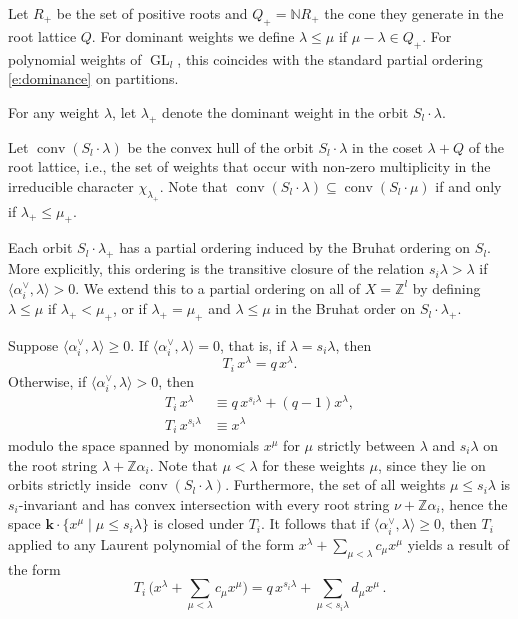 \documentclass[12pt]{amsart}
\theoremstyle{definition}
\theoremstyle{remark}
\newcommand{\NN}{{\mathbb N}}
\newcommand{\ZZ}{{\mathbb Z}}
\newcommand{\kk}{{\mathbf k}}
\DeclareMathOperator{\conv}{conv}
\DeclareMathOperator{\GL}{GL}
\newcommand{\chek}{^{\vee }}
\begin{document}
Let $R_{+}$ be the set of positive roots and $Q_{+} = \NN R_{+}$ the
cone they generate in the root lattice $Q$.  For dominant weights we
define $\lambda \leq \mu $ if $\mu -\lambda \in Q_{+}$.  For
polynomial weights of $\GL_{l}$, this coincides with the standard
partial ordering \eqref{e:dominance} on partitions.

For any weight $\lambda$, let $\lambda _{+}$ denote the dominant
weight in the orbit $S_{l}\cdot \lambda $.

Let $\conv (S_{l}\cdot \lambda )$ be the convex hull of the orbit
$S_{l}\cdot \lambda $ in the coset $\lambda +Q$ of the root lattice,
i.e., the set of weights that occur with non-zero multiplicity in the
irreducible character $\chi _{\lambda _{+}}$.  Note that $\conv
(S_{l}\cdot \lambda )\subseteq \conv (S_{l}\cdot \mu )$ if and only if
$\lambda _{+}\leq \mu _{+}$.

Each orbit $S_{l}\cdot \lambda _{+}$ has a partial ordering induced by
the Bruhat ordering on $S_{l}$.  More explicitly, this ordering is the
transitive closure of the relation $s_{i}\lambda >\lambda $ if
$\langle \alpha _{i}\chek ,\lambda \rangle>0$.  We extend this to a
partial ordering on all of $X = \ZZ ^{l}$ by defining $\lambda \leq
\mu $ if $\lambda _{+}<\mu _{+}$, or if $\lambda _{+} = \mu _{+} $ and
$\lambda \leq \mu $ in the Bruhat order on $S_{l}\cdot \lambda _{+}$.

Suppose $\langle \alpha
_{i}\chek ,\lambda \rangle \geq 0$.  If $\langle \alpha _{i}\chek
,\lambda \rangle = 0$, that is, if $\lambda =s_{i}\lambda $, then
\begin{equation}\label{e:Ti-triangularity-0}
T_{i}\, x^{\lambda } = q\, x^{\lambda }.
\end{equation}
Otherwise, if $\langle \alpha _{i}\chek ,\lambda \rangle >
0$, then
\begin{equation}\label{e:Ti-triagularity-1}
\begin{aligned}
T_{i}\, x^{\lambda } &	\equiv q\, x^{s_{i}\lambda } + (q-1)x^{\lambda},\\
T_{i}\, x^{s_{i}\lambda } &    \equiv x^{\lambda }
\end{aligned}
\end{equation}
modulo the space spanned by monomials $x^{\mu }$ for $\mu $ strictly
between $\lambda $ and $s_{i}\lambda $ on the root string $\lambda
+\ZZ \alpha _{i}$.  Note that $\mu <\lambda $ for these weights $\mu
$, since they lie on orbits strictly inside $\conv (S_{l}\cdot \lambda
)$.  Furthermore, the set of all weights
$\mu \leq s_{i} \lambda $ is
$s_{i}$-invariant and has convex intersection with every root string
$\nu +\ZZ \alpha _{i}$, hence the space $\kk \cdot \{x^{\mu }\mid \mu
\leq s_{i}\lambda \}$ is closed under $T_{i}$.  It follows that if $\langle
\alpha _{i}\chek, \lambda \rangle \ge 0$, then $T_{i}$ applied to any
Laurent polynomial of the form $x^{\lambda}+\sum_{\mu < \lambda}c_\mu
x^{\mu}$ yields a result of the form
\begin{equation}\label{e:Ti-triangularity-2}
T_{i}\, \bigl( x^{\lambda}+\sum_{\mu < \lambda}c_\mu x^{\mu} \bigr) =
q\, x^{s_{i}\lambda } + \sum_{\mu < s_i \lambda} d_\mu x^{\mu}\,.
\end{equation}
\end{document}
